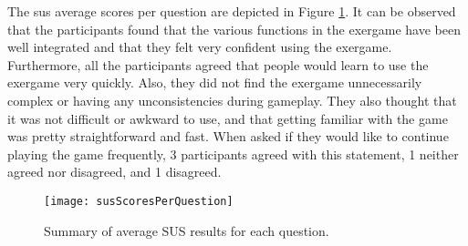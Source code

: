 The \acrshort{sus} average scores per question are depicted in Figure \ref{fig:susPerQuestion}. It can be observed that the participants found that the various functions in the exergame have been well integrated and that they felt very confident using the exergame. Furthermore, all the participants agreed that people would learn to use the exergame very quickly. Also, they did not find the exergame unnecessarily complex or having any unconsistencies during gameplay. They also thought that it was not difficult or awkward to use, and that getting familiar with the game was pretty straightforward and fast. When asked if they would like to continue playing the game frequently, 3 participants agreed with this statement, 1  neither agreed nor disagreed, and 1 disagreed. \pagebreak
\begin{figure}[h]
    \centering
    \texttt{[image: susScoresPerQuestion]}
    \caption{Summary of average SUS results for each question.}
    \label{fig:susPerQuestion}
\end{figure}\\ 
